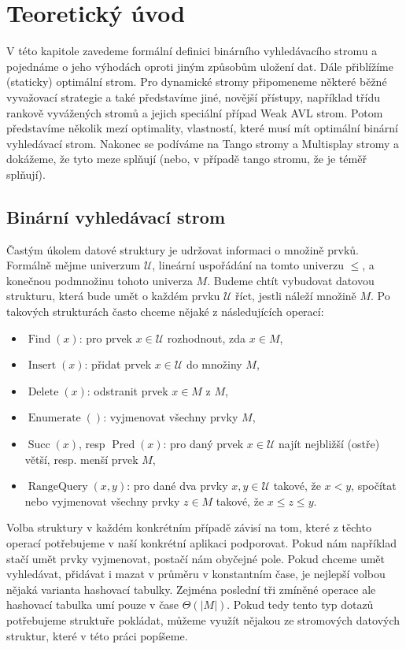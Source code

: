 \chapter{Teoretický úvod}

V této kapitole zavedeme formální definici binárního vyhledávacího stromu a
pojednáme o jeho výhodách oproti jiným způsobům uložení dat. Dále přiblížíme
(staticky) optimální strom. Pro dynamické stromy připomeneme některé běžné
vyvažovací strategie a také představíme jiné, novější přístupy, například třídu
rankově vyvážených stromů a jejich speciální případ Weak AVL strom. Potom
představíme několik mezí optimality, vlastností, které musí mít optimální
binární vyhledávací strom. Nakonec se podíváme na Tango stromy a Multisplay
stromy a dokážeme, že tyto meze splňují (nebo, v případě tango stromu, že je
téměř splňují).

\section{Binární vyhledávací strom}
\def\U{\mathcal U}
\def\o{\mathcal O}
\let\op\operatorname

Častým úkolem datové struktury je udržovat informaci o množině prvků. Formálně
mějme univerzum $\mathcal U$, lineární uspořádání na tomto univerzu $\leq$, a
konečnou podmnožinu tohoto univerza $M$. Budeme chtít vybudovat datovou strukturu, která bude umět o
každém prvku $\mathcal U$ říct, jestli náleží množině $M$. Po takových
strukturách často chceme nějaké z následujících operací:

\begin{itemize}
\item $\op{Find}(x)$: pro prvek $x \in \U$ rozhodnout, zda $x\in M$,
\item $\op{Insert}(x)$: přidat prvek $x \in \U$ do množiny $M$,
\item $\op{Delete}(x)$: odstranit prvek $x\in M$ z $M$,
\item $\op{Enumerate}()$: vyjmenovat všechny prvky $M$,
\item $\op{Succ}(x)$, resp $\op{Pred}(x)$: pro daný prvek $x\in \U $ najít nejbližší (ostře) větší, resp. menší prvek $M$,
\item $\op{RangeQuery}(x,y)$: pro dané dva prvky $x,y\in\U$ takové, že $x<y$, spočítat nebo vyjmenovat všechny prvky $z\in M$ takové, že $x \leq z \leq y$.
\end{itemize}

Volba struktury v každém konkrétním případě závisí na tom, které z těchto
operací potřebujeme v naší konkrétní aplikaci podporovat. Pokud nám například
stačí umět prvky vyjmenovat, postačí nám obyčejné pole. Pokud chceme umět
vyhledávat, přidávat i mazat v průměru v konstantním čase, je nejlepší volbou nějaká
varianta hashovací tabulky. Zejména poslední tři zmíněné operace ale hashovací
tabulka umí pouze v čase $\Theta(|M|)$. Pokud tedy tento typ dotazů potřebujeme
struktuře pokládat, můžeme využít nějakou ze stromových datových struktur,
které v této práci popíšeme.

